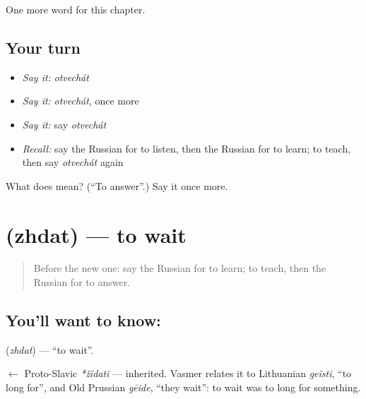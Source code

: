 \begin{grammarlens}[title={What you've built}]
One more word for this chapter.
\end{grammarlens}

\subsection*{Your turn}
\begin{itemize}
\raggedright
  \item \emph{Say it:} \emph{otvechát}
  \item \emph{Say it:} \emph{otvechát}, once more
  \item \emph{Say it:} say \emph{otvechát}
  \item \emph{Recall:} say the Russian for to listen, then the Russian for to learn; to teach, then say \emph{otvechát} again
\end{itemize}

\begin{tcolorbox}[breakable,colback=teal!4,colframe=teal!35!black,title={Before you move on}]
What does  mean? (\textquotedblleft{}To answer\textquotedblright{}.) Say it once more.
\end{tcolorbox}
\section[\texorpdfstring{\ru{ждать} (zhdat)}{ждать (zhdat)}]{ (zhdat) — to wait}

\label{lesson:RU-C41-zhdat}



\begin{quote}
Before the new one: say the Russian for to learn; to teach, then the Russian for to answer.
\end{quote}

\subsection*{You'll want to know: }
\textbf{} (\emph{zhdat}) — \textquotedblleft{}to wait\textquotedblright{}.

\begin{cousinweb}
\textbf{} $\leftarrow$ Proto-Slavic \emph{*žĭdati} — inherited. Vasmer relates it to Lithuanian \emph{geĩsti}, \textquotedblleft{}to long for\textquotedblright{}, and Old Prussian \emph{gēide}, \textquotedblleft{}they wait\textquotedblright{}: to wait was to long for something.
\end{cousinweb}


